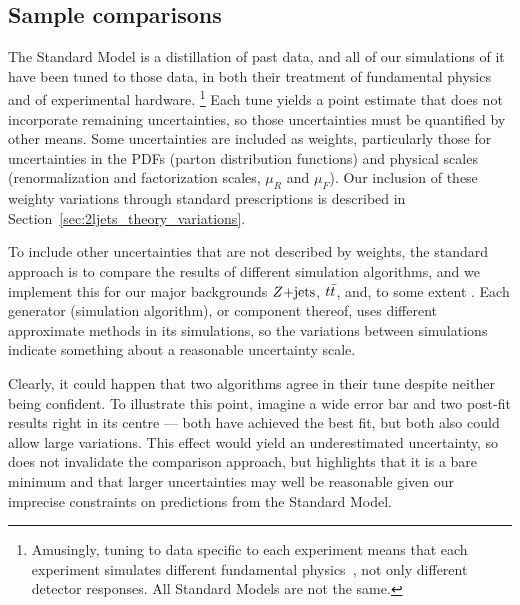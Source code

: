 \subsection{Sample comparisons}
\label{sec:2ljets_sample_comparisons}
The Standard Model is a distillation of past data, and all of our simulations
of it have been tuned to those data, in both their treatment of fundamental
physics and of experimental hardware.%
\footnote{%
Amusingly, tuning to data specific to each experiment means that each
experiment simulates different fundamental physics~\cite{
herwig2000parameter,
Altarelli:473529
}, not only different detector responses.
All Standard Models are not the same.
}
Each tune yields a point estimate that does not incorporate remaining
uncertainties, so those uncertainties must be quantified by other means.
Some uncertainties are included as weights, particularly those for
uncertainties in the
PDFs (parton distribution functions) and physical scales
(renormalization and factorization scales, $\mu_R$ and $\mu_F$).
Our inclusion of these weighty variations through standard prescriptions is
described in Section~\ref{sec:2ljets_theory_variations}.

To include other uncertainties that are not described by weights,
the standard approach is to compare the results of different simulation
algorithms, and we implement this for our major backgrounds $Z\mathrm{+jets}$, $t\bar t$,
and, to some extent \diboson.
Each generator (simulation algorithm), or component thereof, uses different
approximate methods in its simulations, so the variations between simulations
indicate something about a reasonable uncertainty scale.

Clearly, it could happen that two algorithms agree in their tune despite
neither being confident.
To illustrate this point, imagine a wide error bar and
two post-fit results right in its centre ---
both have achieved the best fit, but both also could allow large variations.
This effect would yield an underestimated uncertainty, so does not invalidate
the comparison approach, but highlights that it is a bare minimum and that
larger uncertainties may well be reasonable given our imprecise constraints on
predictions from the Standard Model.


